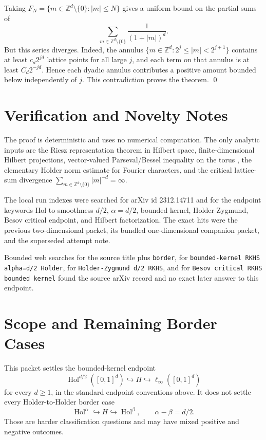\documentclass[11pt]{article}
\newcommand{\Z}{\mathbb{Z}}
\newcommand{\Hol}{\operatorname{Hol}}
\newcommand{\abs}[1]{\left\lvert #1\right\rvert}
\begin{document}
Taking \(F_N=\{m\in\Z^d\setminus\{0\}:\abs m\le N\}\) gives a uniform bound on
the partial sums of
\[
  \sum_{m\in\Z^d\setminus\{0\}}\frac{1}{(1+\abs m)^d}.
\]
But this series diverges. Indeed, the annulus
\(\{m\in\Z^d:2^j\le \abs m<2^{j+1}\}\) contains at least \(c_d2^{jd}\)
lattice points for all large \(j\), and each term on that annulus is at least
\(C_d2^{-jd}\). Hence each dyadic annulus contributes a positive amount
bounded below independently of \(j\). This contradiction proves the theorem.
\qed

\section*{Verification and Novelty Notes}

The proof is deterministic and uses no numerical computation. The only
analytic inputs are the Riesz representation theorem in Hilbert space,
finite-dimensional Hilbert projections, vector-valued Parseval/Bessel
inequality on the torus \cite{Rudin}, the elementary Holder norm estimate for
Fourier characters, and the critical lattice-sum divergence
\(\sum_{m\in\Z^d\setminus\{0\}}|m|^{-d}=\infty\).

The local run indexes were searched for arXiv id 2312.14711 and for the
endpoint keywords Hol to smoothness \(d/2\), \(\alpha=d/2\), bounded kernel,
Holder-Zygmund, Besov critical endpoint, and Hilbert factorization. The exact
hits were the previous two-dimensional packet, its bundled one-dimensional
companion packet, and the superseded attempt note.

Bounded web searches for the source title plus \texttt{border}, for
\texttt{bounded-kernel RKHS alpha=d/2 Holder}, for
\texttt{Holder-Zygmund d/2 RKHS}, and for
\texttt{Besov critical RKHS bounded kernel} found the source
arXiv record and no exact later answer to this endpoint.

\section*{Scope and Remaining Border Cases}

This packet settles the bounded-kernel endpoint
\[
  \Hol^{d/2}([0,1]^d)\hookrightarrow H\hookrightarrow \ell_\infty([0,1]^d)
\]
for every \(d\ge1\), in the standard endpoint conventions above. It does not
settle every Holder-to-Holder border case
\[
  \Hol^\alpha\hookrightarrow H\hookrightarrow \Hol^\beta,
  \qquad \alpha-\beta=d/2.
\]
Those are harder classification questions and may have mixed positive and
negative outcomes.
\end{document}
